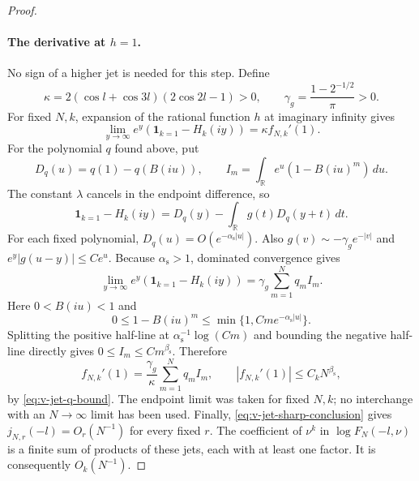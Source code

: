 \begin{proof}
\paragraph{The derivative at $h=1$.}
No sign of a higher jet is needed for this step.  Define
\[
 \kappa=2(\cos l+\cos3 l)(2\cos2 l-1)>0,
 \qquad \gamma_g=\frac{1-2^{-1/2}}\pi>0.
\]
For fixed $N,k$, expansion of the rational function $h$ at imaginary
infinity gives
\begin{equation}\label{eq:v-jet-endpoint-first-limit}
 \lim_{y\to\infty}e^y
       (\mathbf1_{k=1}-H_k(iy))=\kappa f_{N,k}'(1).
\end{equation}
For the polynomial $q$ found above, put
\[
 D_q(u)=q(1)-q(B(iu)),\qquad
 I_m=\int_{\mathbb R}e^u(1-B(iu)^m)\,du.
\]
The constant $\lambda$ cancels in the endpoint difference, so
\[
 \mathbf1_{k=1}-H_k(iy)
       =D_q(y)-\int_{\mathbb R}g(t)D_q(y+t)\,dt.
\]
For each fixed polynomial, $D_q(u)=O(e^{-\alpha_{\mathrm s}|u|})$.
Also $g(v)\sim-\gamma_g e^{-|v|}$ and
$e^y|g(u-y)|\le Ce^u$.  Because $\alpha_{\mathrm s}>1$, dominated
convergence gives
\[
 \lim_{y\to\infty}e^y
       (\mathbf1_{k=1}-H_k(iy))
       =\gamma_g\sum_{m=1}^N q_m I_m.
\]
Here $0<B(iu)<1$ and
\[
 0\le1-B(iu)^m\le\min\{1,Cm e^{-\alpha_{\mathrm s}|u|}\}.
\]
Splitting the positive half-line at
$\alpha_{\mathrm s}^{-1}\log(Cm)$ and bounding the negative half-line
directly gives $0\le I_m\le C m^{\beta_{\mathrm s}}$.  Therefore
\[
 f_{N,k}'(1)=\frac{\gamma_g}{\kappa}\sum_{m=1}^Nq_mI_m,
 \qquad |f_{N,k}'(1)|\le C_kN^{\beta_{\mathrm s}},
\]
by \eqref{eq:v-jet-q-bound}.  The endpoint limit was taken for fixed
$N,k$; no interchange with an $N\to\infty$ limit has been used.
Finally, \eqref{eq:v-jet-sharp-conclusion} gives
$j_{N,r}(- l)=O_r(N^{-1})$ for every fixed $r$.  The coefficient of
$\nu^k$ in $\log F_N(- l,\nu)$ is a finite sum of products of these
jets, each with at least one factor.  It is consequently $O_k(N^{-1})$.
\end{proof}

